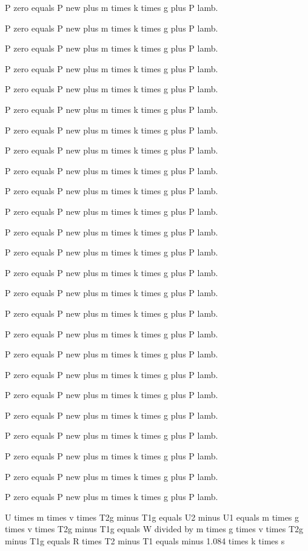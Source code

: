 P zero equals P new plus m times k times g plus P lamb. 

P zero equals P new plus m times k times g plus P lamb. 

P zero equals P new plus m times k times g plus P lamb. 

P zero equals P new plus m times k times g plus P lamb. 

P zero equals P new plus m times k times g plus P lamb. 

P zero equals P new plus m times k times g plus P lamb. 

P zero equals P new plus m times k times g plus P lamb. 

P zero equals P new plus m times k times g plus P lamb. 

P zero equals P new plus m times k times g plus P lamb. 

P zero equals P new plus m times k times g plus P lamb. 

P zero equals P new plus m times k times g plus P lamb. 

P zero equals P new plus m times k times g plus P lamb. 

P zero equals P new plus m times k times g plus P lamb. 

P zero equals P new plus m times k times g plus P lamb. 

P zero equals P new plus m times k times g plus P lamb. 

P zero equals P new plus m times k times g plus P lamb. 

P zero equals P new plus m times k times g plus P lamb. 

P zero equals P new plus m times k times g plus P lamb. 

P zero equals P new plus m times k times g plus P lamb. 

P zero equals P new plus m times k times g plus P lamb. 

P zero equals P new plus m times k times g plus P lamb. 

P zero equals P new plus m times k times g plus P lamb. 

P zero equals P new plus m times k times g plus P lamb. 

P zero equals P new plus m times k times g plus P lamb. 

P zero equals P new plus m times k times g plus P lamb.

U times m times v times T2g minus T1g equals U2 minus U1 equals m times g times v times T2g minus T1g equals W divided by m times g times v times T2g minus T1g equals R times T2 minus T1 equals minus 1.084 times k times s